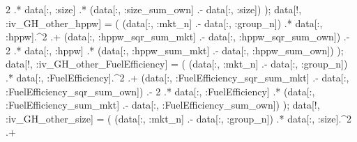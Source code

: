 \documentclass[
  letterpaper,
  DIV=11,
  numbers=noendperiod]{scrreprt}
\newenvironment{Shaded}{\begin{snugshade}}{\end{snugshade}}
\newcommand{\FloatTok}[1]{\textcolor[rgb]{0.68,0.00,0.00}{#1}}
\newcommand{\NormalTok}[1]{\textcolor[rgb]{0.00,0.23,0.31}{#1}}
\newcommand{\OperatorTok}[1]{\textcolor[rgb]{0.37,0.37,0.37}{#1}}
\begin{document}
\begin{Shaded}
\begin{Highlighting}[]
    \FloatTok{2} \OperatorTok{.*}\NormalTok{ data[}\OperatorTok{:}\NormalTok{, }\OperatorTok{:}\NormalTok{size] }\OperatorTok{.*}\NormalTok{ (data[}\OperatorTok{:}\NormalTok{, }\OperatorTok{:}\NormalTok{size\_sum\_own] }\OperatorTok{.{-}}\NormalTok{ data[}\OperatorTok{:}\NormalTok{, }\OperatorTok{:}\NormalTok{size])}
\NormalTok{);}
\NormalTok{data[!, }\OperatorTok{:}\NormalTok{iv\_GH\_other\_hppw]           }\OperatorTok{=}\NormalTok{ (}
\NormalTok{    (data[}\OperatorTok{:}\NormalTok{, }\OperatorTok{:}\NormalTok{mkt\_n] }\OperatorTok{.{-}}\NormalTok{ data[}\OperatorTok{:}\NormalTok{, }\OperatorTok{:}\NormalTok{group\_n]) }\OperatorTok{.*}\NormalTok{ data[}\OperatorTok{:}\NormalTok{, }\OperatorTok{:}\NormalTok{hppw]}\OperatorTok{.\^{}}\FloatTok{2} \OperatorTok{.+} 
\NormalTok{    (data[}\OperatorTok{:}\NormalTok{, }\OperatorTok{:}\NormalTok{hppw\_sqr\_sum\_mkt] }\OperatorTok{.{-}}\NormalTok{ data[}\OperatorTok{:}\NormalTok{, }\OperatorTok{:}\NormalTok{hppw\_sqr\_sum\_own]) }\OperatorTok{.{-}} 
    \FloatTok{2} \OperatorTok{.*}\NormalTok{ data[}\OperatorTok{:}\NormalTok{, }\OperatorTok{:}\NormalTok{hppw] }\OperatorTok{.*}\NormalTok{ (data[}\OperatorTok{:}\NormalTok{, }\OperatorTok{:}\NormalTok{hppw\_sum\_mkt] }\OperatorTok{.{-}}\NormalTok{ data[}\OperatorTok{:}\NormalTok{, }\OperatorTok{:}\NormalTok{hppw\_sum\_own])}
\NormalTok{);}
\NormalTok{data[!, }\OperatorTok{:}\NormalTok{iv\_GH\_other\_FuelEfficiency] }\OperatorTok{=}\NormalTok{ (}
\NormalTok{    (data[}\OperatorTok{:}\NormalTok{, }\OperatorTok{:}\NormalTok{mkt\_n] }\OperatorTok{.{-}}\NormalTok{ data[}\OperatorTok{:}\NormalTok{, }\OperatorTok{:}\NormalTok{group\_n]) }\OperatorTok{.*}\NormalTok{ data[}\OperatorTok{:}\NormalTok{, }\OperatorTok{:}\NormalTok{FuelEfficiency]}\OperatorTok{.\^{}}\FloatTok{2} \OperatorTok{.+} 
\NormalTok{    (data[}\OperatorTok{:}\NormalTok{, }\OperatorTok{:}\NormalTok{FuelEfficiency\_sqr\_sum\_mkt] }\OperatorTok{.{-}}\NormalTok{ data[}\OperatorTok{:}\NormalTok{, }\OperatorTok{:}\NormalTok{FuelEfficiency\_sqr\_sum\_own]) }\OperatorTok{.{-}} 
    \FloatTok{2} \OperatorTok{.*}\NormalTok{ data[}\OperatorTok{:}\NormalTok{, }\OperatorTok{:}\NormalTok{FuelEfficiency] }\OperatorTok{.*}\NormalTok{ (data[}\OperatorTok{:}\NormalTok{, }\OperatorTok{:}\NormalTok{FuelEfficiency\_sum\_mkt] }\OperatorTok{.{-}}\NormalTok{ data[}\OperatorTok{:}\NormalTok{, }\OperatorTok{:}\NormalTok{FuelEfficiency\_sum\_own])}
\NormalTok{);}
\NormalTok{data[!, }\OperatorTok{:}\NormalTok{iv\_GH\_other\_size]           }\OperatorTok{=}\NormalTok{ (}
\NormalTok{    (data[}\OperatorTok{:}\NormalTok{, }\OperatorTok{:}\NormalTok{mkt\_n] }\OperatorTok{.{-}}\NormalTok{ data[}\OperatorTok{:}\NormalTok{, }\OperatorTok{:}\NormalTok{group\_n]) }\OperatorTok{.*}\NormalTok{ data[}\OperatorTok{:}\NormalTok{, }\OperatorTok{:}\NormalTok{size]}\OperatorTok{.\^{}}\FloatTok{2} \OperatorTok{.+} 

\end{Highlighting}
\end{Shaded}
\end{document}
